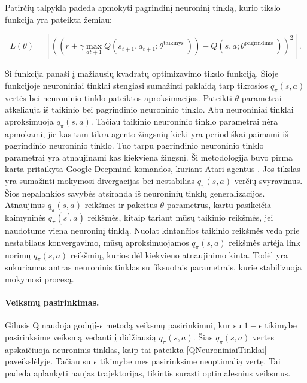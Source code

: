 \documentclass[a4paper, 12pt]{article}
\begin{document}
Patirčių talpykla padeda apmokyti pagrindinį neuroninį tinklą, kurio tikslo funkcija yra pateikta žemiau:

\begin{equation}
L(\theta)=\left[\left(\left(r+\gamma \max _{a t+1} Q\left(s_{t+1}, a_{t+1} ; \theta^{\text {taikinys }}\right)\right)-Q\left(s, a ; \theta^{\text {pagrindinis }}\right)\right)^{2}\right].
\end{equation}

Ši funkcija panaši į mažiausių kvadratų optimizavimo tikslo funkciją. Šioje funkcijoje neuroniniai tinklai stengiasi sumažinti paklaidą tarp tikrosios $q_{\pi}(s, a)$ vertės bei neuroninio tinklo pateiktos aproksimacijos. Pateikti $\theta$ parametrai atkeliauja iš taikinio bei pagrindinio neuroninio tinklo. Abu neuroniniai tinklai aproksimuoja $q_{\pi}(s, a)$. Tačiau taikinio neuroninio tinklo parametrai nėra apmokami, jie kas tam tikra agento žingsnių kieki yra periodiškai paimami iš pagrindinio neuroninio tinklo. Tuo tarpu pagrindinio neuroninio tinklo parametrai yra atnaujinami kas kiekviena žingsnį. Ši metodologija buvo pirma karta pritaikyta Google Deepmind komandos, kuriant Atari agentus \cite{GoogleDeepQLearning}. Jos tikslas yra sumažinti mokymosi divergacijas bei nestabilias $q_{\pi}(s, a)$ verčių svyravimus. Šios nepalankios savybės atsiranda iš neuroninių tinklų generalizacijos. Atnaujinus $q_{\pi}(s, a)$ reikšmes ir pakeitus $\theta$ parametrus, kartu pasikeičia kaimyninės $q_{\pi}(s^\prime, a)$ reikšmės, kitaip tariant mūsų taikinio reikšmės, jei naudotume viena neuroninį tinklą. Nuolat kintančios taikinio reikšmės veda prie nestabilaus konvergavimo, mūsų aproksimuojamos $q_{\pi}(s, a)$ reikšmės artėja link norimų $q_{\pi}(s, a)$ reikšmių, kurios dėl kiekvieno atnaujinimo kinta. Todėl yra sukuriamas antras neuroninis tinklas su fiksuotais parametrais, kurie stabilizuoja mokymosi procesą.

\paragraph{Veiksmų pasirinkimas.}

Gilusis Q naudoja godųjį-$\epsilon$ metodą veiksmų pasirinkimui, kur su $1-\epsilon$ tikimybe pasirinksime veiksmą vedanti į didžiausią $q_{\pi}(s, a)$. Šias $q_{\pi}(s, a)$ vertes apskaičiuoja neuroninis tinklas, kaip tai pateikta \ref{QNeuroniniaiTinklai} paveikslėlyje. Tačiau su $\epsilon$ tikimybe mes pasirinksime neoptimalią vertę. Tai padeda aplankyti naujas trajektorijas, tikintis surasti optimalesnius veiksmus.
\end{document}
